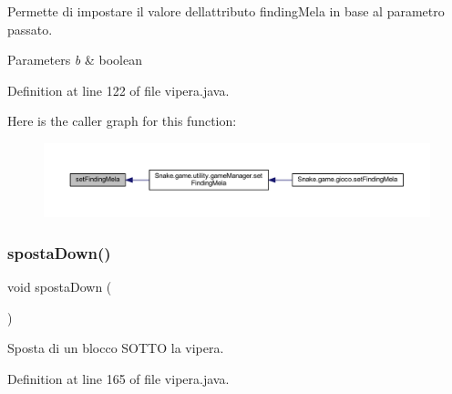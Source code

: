 Permette di impostare il valore dell\textquotesingle{}attributo finding\+Mela in base al parametro passato. 


\begin{DoxyParams}{Parameters}
{\em b} & boolean \\
\hline
\end{DoxyParams}


Definition at line 122 of file vipera.\+java.

Here is the caller graph for this function\+:
\nopagebreak
\begin{figure}[H]
\begin{center}
\leavevmode
\includegraphics[width=350pt]{class_snake_1_1game_1_1vipera_1_1vipera_a169584b55e994918baf671fe1c741e39_icgraph}
\end{center}
\end{figure}
\mbox{\label{class_snake_1_1game_1_1vipera_1_1vipera_a00853f3bb0a1c94d5a67c763d29acd84}} 
\subsubsection{\texorpdfstring{sposta\+Down()}{spostaDown()}}
{\footnotesize\ttfamily void sposta\+Down (\begin{DoxyParamCaption}{ }\end{DoxyParamCaption})}



Sposta di un blocco S\+O\+T\+TO la vipera. 



Definition at line 165 of file vipera.\+java.

